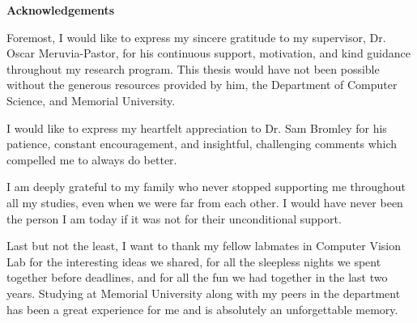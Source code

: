 \begin{center}
\textbf{\large Acknowledgements}
\end{center}

\vspace{1cm}

Foremost, I would like to express my sincere gratitude to my supervisor, Dr. Oscar Meruvia-Pastor, for his continuous support, motivation, and 
kind guidance throughout my research program. This 
thesis would have not been possible without the generous resources provided by him, the Department of Computer Science, and Memorial University.

I would like to express my heartfelt appreciation to Dr. Sam Bromley for his patience, constant encouragement, and insightful, challenging comments which compelled me to always
do better.

I am deeply grateful to my family who never stopped supporting me throughout all my studies, even when we were far from each other. I would have never been the person I am today if 
it was not for their unconditional support.

Last but not the least, I want to thank my fellow labmates in Computer Vision Lab for the interesting ideas we shared, for all the sleepless nights we spent together before deadlines, 
and for all the fun we had together in the last two years. Studying at Memorial University along with my peers in the department has been a great experience for me
and is absolutely an unforgettable memory.
